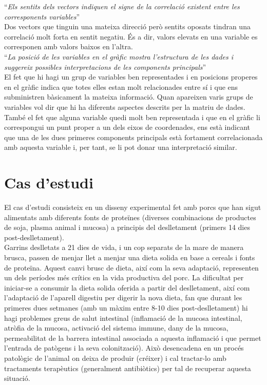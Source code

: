 \documentclass[english]{article}
\begin{document}
``\textit{Els sentits dels vectors indiquen el signe de la correlació existent entre les
corresponents variables}''
\\

Dos vectors que tinguin una mateixa direcció però sentits oposats tindran una correlació
molt forta en sentit negatiu. És a dir, valors elevats en una variable es corresponen amb
valors baixos en l'altra.
\\

``\textit{La posició de les variables en el gràfic mostra l'estructura de les dades i suggereix possibles interpretacions de les components principals}''
\\

El fet que hi hagi un grup de variables ben representades i en posicions properes en el
gràfic indica que totes elles estan molt relacionades entre sí i que ens subministren
bàsicament la mateixa informació. Quan apareixen varis grups de variables vol dir que hi
ha diferents aspectes descrits per la matriu de dades. També el fet que alguna variable quedi molt ben representada i que en el gràfic li correspongui un punt proper a un dels eixos de coordenades, ens està indicant que una de les dues primeres components principals està fortament correlacionada amb aquesta variable i, per tant, se li pot donar una interpretació similar.


\clearpage
\section{Cas d'estudi}
El cas d'estudi consisteix en un disseny experimental fet amb porcs que han sigut alimentats amb diferents fonts de proteïnes (diverses combinacions de productes de soja, plasma animal i mucosa) a principis del deslletament (primers 14 dies post-deslletament).\\

Garrins deslletats a 21 dies de vida, i un cop separats de la mare de manera brusca, passen de menjar llet a menjar una dieta solida en base a cereals i fonts de proteïna. Aquest canvi brusc de dieta, així com la seva adaptació, representen un dels períodes més crítics en la vida productiva del porc. La dificultat per iniciar-se a consumir la dieta solida oferida a partir del deslletament, així com l'adaptació de l'aparell digestiu per digerir la nova dieta, fan que durant les primeres dues setmanes (amb un màxim entre 8-10 dies post-deslletament) hi hagi problemes greus de salut intestinal (inflamació de la mucosa intestinal, atròfia de la mucosa, activació del sistema immune, dany de la mucosa, permeabilitat de la barrera intestinal associada a aquesta inflamació i que permet l'entrada de patògens i la seva colonització). Això desencadena en un procés patològic de l'animal on deixa de produir (créixer) i cal tractar-lo amb tractaments terapèutics (generalment antibiòtics) per tal de recuperar aquesta situació. \\
\end{document}
